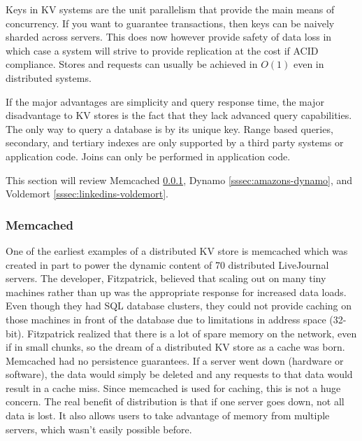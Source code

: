 \documentclass[]{article}
\begin{document}
Keys in KV systems are the unit parallelism that provide the main means of concurrency. If you want to guarantee transactions, then keys can be naively sharded across servers. This does now however provide safety of data loss in which case a system will strive to provide replication at the cost if ACID compliance. Stores and requests can usually be achieved in $O(1)$ even in distributed systems\cite{ravendb}.

If the major advantages are simplicity and query response time\cite{chen_big_2014}, the major disadvantage to KV stores is the fact that they lack advanced query capabilities. The only way to query a database is by its unique key. Range based queries, secondary, and tertiary indexes are only supported by a third party systems or application code. Joins can only be performed in application code\cite{design-voldemort}.

This section will review Memcached \ref{sssec:memcached}, Dynamo \ref{sssec:amazons-dynamo}, and Voldemort \ref{sssec:linkedins-voldemort}.

\subsubsection{Memcached}\label{sssec:memcached}
One of the earliest examples of a distributed KV store is memcached\cite{fitzpatrick_distributed_2004} which was created in part to power the dynamic content of 70 distributed LiveJournal servers. The developer, Fitzpatrick, believed that scaling out on many tiny machines rather than up was the appropriate response for increased data loads. Even though they had SQL database clusters, they could not provide caching on those machines in front of the database due to limitations in address space (32-bit). Fitzpatrick realized that there is a lot of spare memory on the network, even if in small chunks, so the dream of a distributed KV store as a cache was born. Memcached had no persistence guarantees. If a server went down (hardware or software), the data would simply be deleted and any requests to that data would result in a cache miss. Since memcached is used for caching, this is not a huge concern. The real benefit of distribution is that if one server goes down, not all data is lost. It also allows users to take advantage of memory from multiple servers, which wasn't easily possible before.
\end{document}
